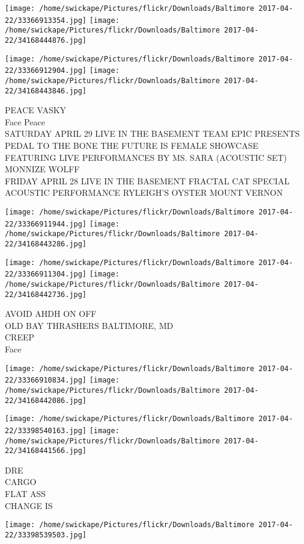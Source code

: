 \documentclass[10pt,letterpaper]{article}
\begin{document}
\texttt{[image: /home/swickape/Pictures/flickr/Downloads/Baltimore 2017-04-22/33366913354.jpg]}
\texttt{[image: /home/swickape/Pictures/flickr/Downloads/Baltimore 2017-04-22/34168444876.jpg]}

\texttt{[image: /home/swickape/Pictures/flickr/Downloads/Baltimore 2017-04-22/33366912904.jpg]}
\texttt{[image: /home/swickape/Pictures/flickr/Downloads/Baltimore 2017-04-22/34168443846.jpg]}

PEACE VASKY\\
Face Peace\\
SATURDAY APRIL 29 LIVE IN THE BASEMENT TEAM EPIC PRESENTS PEDAL TO THE BONE THE FUTURE IS FEMALE SHOWCASE FEATURING LIVE PERFORMANCES BY MS. SARA (ACOUSTIC SET)  MONNIZE WOLFF\\
FRIDAY APRIL 28 LIVE IN THE BASEMENT FRACTAL CAT SPECIAL ACOUSTIC PERFORMANCE RYLEIGH'S OYSTER MOUNT VERNON
\pagebreak

\texttt{[image: /home/swickape/Pictures/flickr/Downloads/Baltimore 2017-04-22/33366911944.jpg]}
\texttt{[image: /home/swickape/Pictures/flickr/Downloads/Baltimore 2017-04-22/34168443286.jpg]}

\texttt{[image: /home/swickape/Pictures/flickr/Downloads/Baltimore 2017-04-22/33366911304.jpg]}
\texttt{[image: /home/swickape/Pictures/flickr/Downloads/Baltimore 2017-04-22/34168442736.jpg]}

AVOID AHDH ON OFF\\
OLD BAY THRASHERS BALTIMORE, MD\\
CREEP\\
Face
\pagebreak

\texttt{[image: /home/swickape/Pictures/flickr/Downloads/Baltimore 2017-04-22/33366910834.jpg]}
\texttt{[image: /home/swickape/Pictures/flickr/Downloads/Baltimore 2017-04-22/34168442086.jpg]}

\texttt{[image: /home/swickape/Pictures/flickr/Downloads/Baltimore 2017-04-22/33398540163.jpg]}
\texttt{[image: /home/swickape/Pictures/flickr/Downloads/Baltimore 2017-04-22/34168441566.jpg]}

DRE\\
CARGO\\
FLAT ASS\\
CHANGE IS
\pagebreak

\texttt{[image: /home/swickape/Pictures/flickr/Downloads/Baltimore 2017-04-22/33398539503.jpg]}
\end{document}
